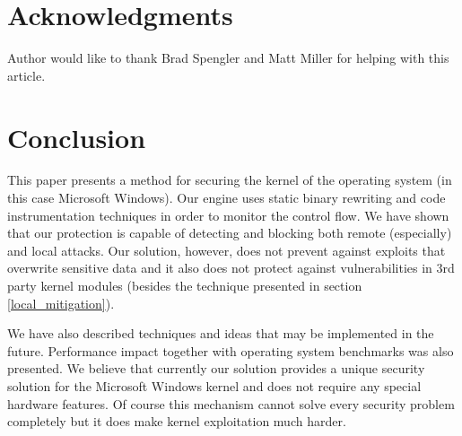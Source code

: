 \documentclass[10pt,twocolumn,a4paper]{article}
\begin{document}
\section*{Acknowledgments}

Author would like to thank Brad Spengler and Matt Miller for helping with this article.


\section{Conclusion}

This paper presents a method for securing the kernel of the operating system (in this case Microsoft Windows). Our engine uses static binary rewriting and code instrumentation techniques in order to monitor the control flow. We have shown that our protection is capable of detecting and blocking both remote (especially) and local attacks. Our solution, however, does not prevent against exploits that overwrite sensitive data and it also does not protect against vulnerabilities in 3rd party kernel modules (besides the technique presented in section \ref{local_mitigation}). 

We have also described techniques and ideas that may be implemented in the future. Performance impact together with operating system benchmarks was also presented. We believe that currently our solution provides a unique security solution for the Microsoft Windows kernel and does not require any special hardware features. Of course this mechanism cannot solve every security problem completely but it does make kernel exploitation much harder.

\newpage


\end{document}
